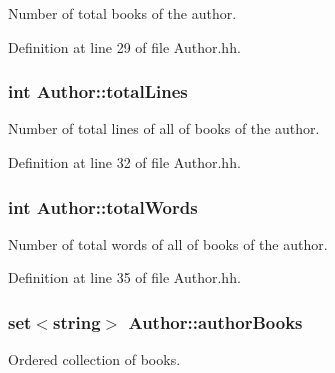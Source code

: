 Number of total books of the author. 



Definition at line 29 of file Author.\+hh.

\subsubsection[{\texorpdfstring{total\+Lines}{totalLines}}]{\setlength{\rightskip}{0pt plus 5cm}int Author\+::total\+Lines\hspace{0.3cm}{\ttfamily [private]}}\hypertarget{class_author_a8d818414bbd909287641b388601bf61a}{}\label{class_author_a8d818414bbd909287641b388601bf61a}


Number of total lines of all of books of the author. 



Definition at line 32 of file Author.\+hh.

\subsubsection[{\texorpdfstring{total\+Words}{totalWords}}]{\setlength{\rightskip}{0pt plus 5cm}int Author\+::total\+Words\hspace{0.3cm}{\ttfamily [private]}}\hypertarget{class_author_a478c72fff965eb1ee8fcaddfe173715b}{}\label{class_author_a478c72fff965eb1ee8fcaddfe173715b}


Number of total words of all of books of the author. 



Definition at line 35 of file Author.\+hh.

\subsubsection[{\texorpdfstring{author\+Books}{authorBooks}}]{\setlength{\rightskip}{0pt plus 5cm}set$<$string$>$ Author\+::author\+Books\hspace{0.3cm}{\ttfamily [private]}}\hypertarget{class_author_ad9ffe450cdafed2242936f6fcafa22b4}{}\label{class_author_ad9ffe450cdafed2242936f6fcafa22b4}


Ordered collection of books. 


